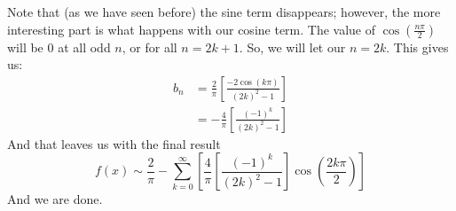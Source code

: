 \documentclass{article}
\begin{document}
\noindent Note that (as we have seen before) the sine term disappears; however,
the more interesting part is what happens with our cosine term. The value of
$\cos{\left(\frac{n\pi}{2}\right)}$ will be 0 at all odd $n$, or for all
$n = 2k + 1$. So, we will let our $n = 2k$. This gives us:
\begin{align*}
b_{n} &= \frac{2}{\pi} \left[ \frac{-2 \cos{\left(k \pi \right)}}{(2k)^{2} - 1}\right]\\
&= -\frac{4}{\pi}\left[\frac{(-1)^{k}}{(2k)^{2}-1}\right]
\end{align*}
\noindent And that leaves us with the final result
\[
f(x)\sim \frac{2}{\pi} - \sum_{k=0}^{\infty}\left[\frac{4}{\pi}\left[\frac{(-1)^{k}}{(2k)^{2}-1}\right]
\cos{\left(\frac{2k\pi}{2}\right)}\right]
\]
And we are done.
\newpage
\end{document}
